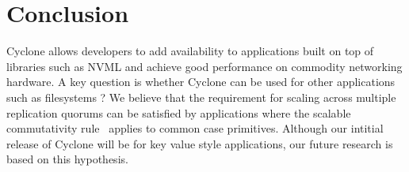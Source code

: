 \documentclass[letterpaper,twocolumn,10pt]{article}
\begin{document}
\section{Conclusion}
Cyclone allows developers to add availability to applications built on top of
libraries such as NVML and achieve good performance on commodity networking
hardware. A key question is whether Cyclone can be used for other applications
such as filesystems ? We believe that the requirement for scaling across
multiple replication quorums can be satisfied by applications where the scalable
commutativity rule~\cite{scalable_commutativity} applies to common case
primitives. Although our intitial release of Cyclone will be for
key value style applications, our future research is based on this hypothesis.
\newcommand\myurl[2]{\url{#1}}


\end{document}
